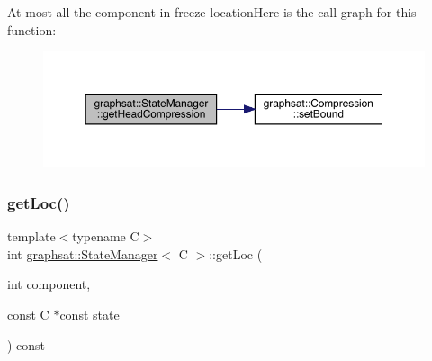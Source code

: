 At most all the component in freeze locationHere is the call graph for this function\+:
\nopagebreak
\begin{figure}[H]
\begin{center}
\leavevmode
\includegraphics[width=350pt]{classgraphsat_1_1_state_manager_a387d00e5d3cd6bd2362986f037dc926e_cgraph}
\end{center}
\end{figure}
\mbox{\label{classgraphsat_1_1_state_manager_a519879992df5ba58f27ae21ddf766a8e}} 
\subsubsection{\texorpdfstring{getLoc()}{getLoc()}}
{\footnotesize\ttfamily template$<$typename C$>$ \\
int \mbox{\hyperlink{classgraphsat_1_1_state_manager}{graphsat\+::\+State\+Manager}}$<$ C $>$\+::get\+Loc (\begin{DoxyParamCaption}\item[{int}]{component,  }\item[{const C $\ast$const}]{state }\end{DoxyParamCaption}) const\hspace{0.3cm}{\ttfamily [inline]}}


